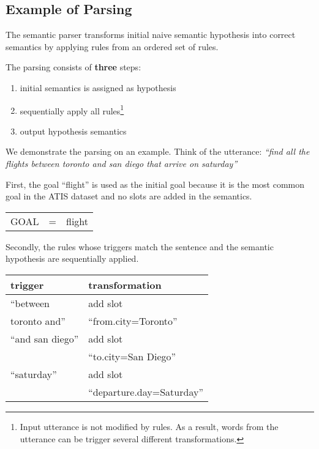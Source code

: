 \documentclass[11pt]{article}
\begin{document}
\subsection{Example of Parsing} \label{sec:tbl:example}
The semantic parser transforms initial naive semantic hypothesis into correct semantics by applying rules from an ordered set of rules. 

The parsing consists of \textbf{three} steps: 
\begin{enumerate}
  \item initial semantics is assigned as hypothesis
  \item sequentially apply all rules\footnote{Input utterance is not modified by rules. As a result, words from the utterance can be trigger several different transformations.}
  \item output hypothesis semantics
\end{enumerate}

We demonstrate the parsing on an example. Think of the utterance: \textit{``find all the flights between toronto and san diego that arrive on saturday''} 

First, the goal ``flight'' is used as the initial goal because it is the most common goal in the ATIS dataset and no slots are added in the semantics.

\vspace{.25cm}
\begin{tabular}{lll}
  GOAL & = & flight
\end{tabular} 
\vspace{.25cm}

Secondly, the rules whose triggers match the sentence and the semantic hypothesis are sequentially applied.

\vspace{.25cm}
\begin{tabular}{ll}
  trigger & transformation \\
  \hline 
  ``between               & add slot \\
    toronto and''         &``from.city=Toronto'' \\
  ``and san diego''       & add slot \\
                          & ``to.city=San Diego'' \\
  ``saturday''            & add slot \\
                          & ``departure.day=Saturday'' \\
\end{tabular} 
\vspace{.25cm}
\end{document}
